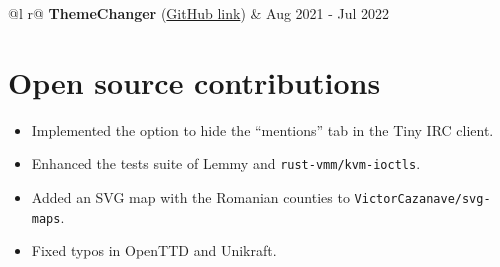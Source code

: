\documentclass[a4paper,12pt]{article}
\begin{document}
\begin{tabularx}{\linewidth}{ @{}l r@{} }
\textbf{ThemeChanger} (\href{https://github.com/ALEX11BR/ThemeChanger}{GitHub link}) & \hfill \faCalendar* Aug 2021 - Jul 2022 \\[3.75pt]
\end{tabularx}


\section{Open source contributions}
\begin{itemize}[nosep,after=\strut, leftmargin=1em, itemsep=3pt]
    \item Implemented the option to hide the ``mentions'' tab in the Tiny IRC client.
    \item Enhanced the tests suite of Lemmy and \verb|rust-vmm/kvm-ioctls|.
    \item Added an SVG map with the Romanian counties to \verb|VictorCazanave/svg-maps|.
    \item Fixed typos in OpenTTD and Unikraft.
\end{itemize}
\end{document}
